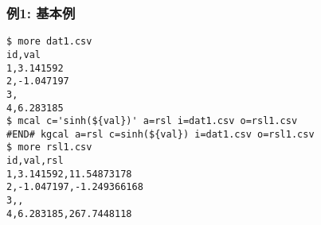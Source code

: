\subsubsection*{例1: 基本例}



\begin{Verbatim}[baselinestretch=0.7,frame=single]
$ more dat1.csv
id,val
1,3.141592
2,-1.047197
3,
4,6.283185
$ mcal c='sinh(${val})' a=rsl i=dat1.csv o=rsl1.csv
#END# kgcal a=rsl c=sinh(${val}) i=dat1.csv o=rsl1.csv
$ more rsl1.csv
id,val,rsl
1,3.141592,11.54873178
2,-1.047197,-1.249366168
3,,
4,6.283185,267.7448118
\end{Verbatim}
